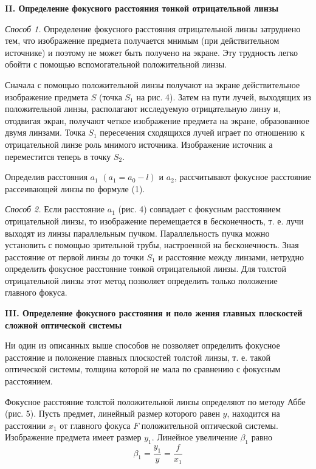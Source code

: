 \documentclass[14pt]{article}
\begin{document}
\vspace{1cm}
\textbf{II. Определение фокусного расстояния тонкой отрицательной линзы}

\textsl{Способ 1.} Определение фокусного расстояния отрицательной линзы
затруднено тем, что изображение предмета получается мнимым
(при действительном источнике)
и поэтому не может быть получено на
экране. Эту трудность легко обойти с помощью вспомогательной положительной
линзы.


Сначала с помощью положительной
линзы получают на экране
действительное изображение предмета
$S$ (точка $S_1$ на рис. 4). Затем
на пути лучей, выходящих из положительной
линзы, располагают исследуемую
отрицательную линзу и,
отодвигая экран, получают четкое
изображение предмета на экране,
образованное двумя линзами.
Точка
$S_1$ пересечения сходящихся лучей играет по отношению
к отрицательной
линзе роль мнимого источника. Изображение источник
а переместится теперь в точку $S_2$.


Определив расстояния $a_1$ $(a_1 = a_0 − l)$ и
$a_2$, рассчитывают фокусное
расстояние рассеивающей линзы по формуле (1).

\textsl{Способ 2.} Если расстояние
$a_1$ (рис. 4) совпадает с фокусным расстоянием
отрицательной линзы, то изображение перемещается в бесконечность,
т. е. лучи выходят из линзы параллельным пучком.
Параллельность пучка можно
установить с помощью зрительной трубы,
настроенной на бесконечность. Зная расстояние от первой линзы до
точки
$S_1$ и расстояние между линзами, нетрудно определить фокусное
расстояние тонкой отрицательной линзы. Для толстой отрицательной
линзы этот метод позволяет определить только положение главного фокуса.

\vspace{1cm}
\textbf{III. Определение фокусного расстояния и поло
жения главных плоскостей
сложной оптической системы}

Ни один из описанных выше способов не позволяет определить фокусное
расстояние
и положение главных плоскостей толстой линзы, т. е.
такой оптической системы, толщина
которой не мала по сравнению с
фокусным расстоянием.

Фокусное расстояние толстой положительной линзы определяют по
методу Аббе (рис. 5). Пусть предмет, линейный размер
которого равен
$y$,
находится на расстоянии
$x_1$ от главного фокуса
$F$ положительной оптической
системы. Изображение предмета имеет размер
$y_1$. Линейное
увеличение
$\beta_1$ равно
\begin{equation}
\beta_1 = \frac{y_1}{y} = \frac{f}{x_1}
\end{equation}
\end{document}
